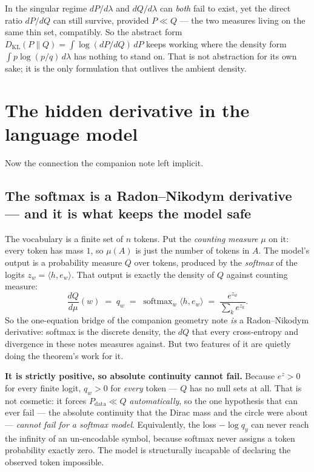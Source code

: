\documentclass[11pt]{article}
\begin{document}
\begin{insight}
In the singular regime $dP/d\lambda$ and $dQ/d\lambda$ can \emph{both} fail to exist, yet the
direct ratio $dP/dQ$ can still survive, provided $P \ll Q$ --- the two measures living on the
same thin set, compatibly. So the abstract form $D_{\mathrm{KL}}(P\|Q) = \int \log(dP/dQ)\,dP$
keeps working where the density form $\int p \log(p/q)\, d\lambda$ has nothing to stand on.
That is not abstraction for its own sake; it is the only formulation that outlives the ambient
density.
\end{insight}

\section{The hidden derivative in the language model}

Now the connection the companion note left implicit.

\subsection*{The softmax is a Radon--Nikodym derivative --- and it is what keeps the model safe}

The vocabulary is a finite set of $n$ tokens. Put the \emph{counting measure} $\mu$ on it:
every token has mass $1$, so $\mu(A)$ is just the number of tokens in $A$. The model's output
is a probability measure $Q$ over tokens, produced by the \emph{softmax} of the logits
$z_w = \langle h, e_w\rangle$. That output is exactly the density of $Q$ against counting
measure:
\[
  \frac{dQ}{d\mu}(w) \;=\; q_w \;=\; \operatorname{softmax}_w \langle h, e_w \rangle
    \;=\; \frac{e^{z_w}}{\sum_k e^{z_k}} .
\]
So the one-equation bridge of the companion geometry note \emph{is} a Radon--Nikodym
derivative: softmax is the discrete density, the $dQ$ that every cross-entropy and divergence
in these notes measures against. But two features of it are quietly doing the theorem's work
for it.

\textbf{It is strictly positive, so absolute continuity cannot fail.} Because $e^{z} > 0$ for
every finite logit, $q_w > 0$ for \emph{every} token --- $Q$ has no null sets at all. That is
not cosmetic: it forces $P_{\text{data}} \ll Q$ \emph{automatically}, so the one hypothesis
that can ever fail --- the absolute continuity that the Dirac mass and the circle were about
--- \emph{cannot fail for a softmax model}. Equivalently, the loss $-\log q_y$ can never reach
the infinity of an un-encodable symbol, because softmax never assigns a token probability
exactly zero. The model is structurally incapable of declaring the observed token impossible.
\end{document}
